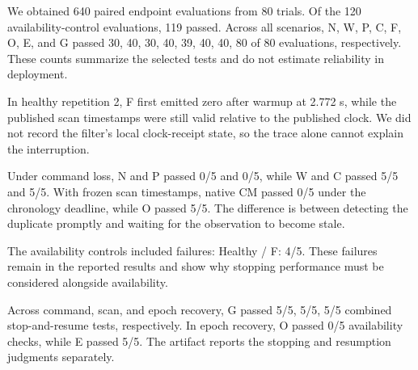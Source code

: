 We obtained 640 paired endpoint evaluations from 80 trials. Of the 120 availability-control evaluations, 119 passed. Across all scenarios, N, W, P, C, F, O, E, and G passed 30, 40, 30, 40, 39, 40, 40, 80 of 80 evaluations, respectively. These counts summarize the selected tests and do not estimate reliability in deployment.

In healthy repetition 2, F first emitted zero after warmup at 2.772 s, while the published scan timestamps were still valid relative to the published clock. We did not record the filter's local clock-receipt state, so the trace alone cannot explain the interruption.

Under command loss, N and P passed 0/5 and 0/5, while W and C passed 5/5 and 5/5. With frozen scan timestamps, native CM passed 0/5 under the chronology deadline, while O passed 5/5. The difference is between detecting the duplicate promptly and waiting for the observation to become stale.

The availability controls included failures: Healthy / F: 4/5. These failures remain in the reported results and show why stopping performance must be considered alongside availability.

Across command, scan, and epoch recovery, G passed 5/5, 5/5, 5/5 combined stop-and-resume tests, respectively. In epoch recovery, O passed 0/5 availability checks, while E passed 5/5. The artifact reports the stopping and resumption judgments separately.
